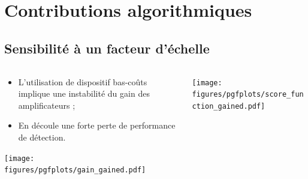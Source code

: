 \documentclass[../main.tex]{subfiles}
\begin{document}
\section{Contributions algorithmiques}

\subsection{Sensibilité à un facteur d'échelle}

\begin{frame}{\subsecname}
  \begin{columns}
    \begin{column}{.5\linewidth}
      \centering
      \begin{itemize}
        \item L'utilisation de dispositif bas-coûts implique une instabilité du gain des amplificateurs ;
        \item En découle une forte perte de performance de détection.
      \end{itemize} \vspace*{1 em}

      \texttt{[image: figures/pgfplots/gain\_gained.pdf]}
    \end{column}
    \begin{column}{.5\linewidth}
      \texttt{[image: figures/pgfplots/score\_function\_gained.pdf]}
    \end{column}
  \end{columns}
\end{frame}
\end{document}
